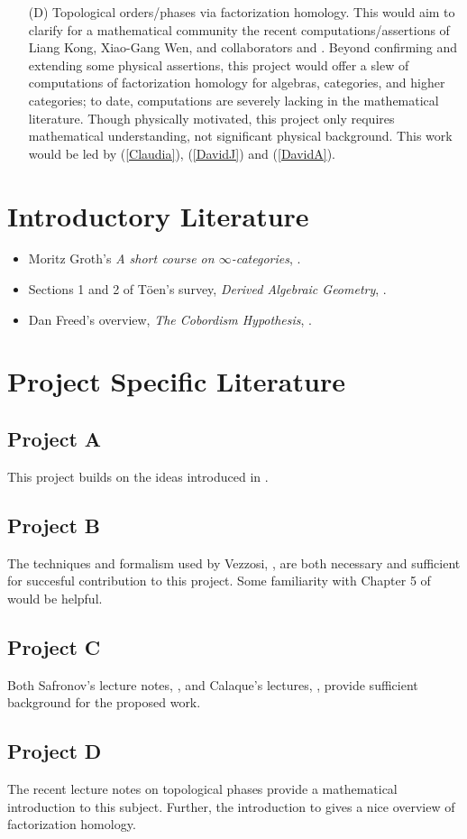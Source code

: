 \documentclass[11pt]{amsart}
\begin{document}
\begin{itemize}
\item[(D)] Topological orders/phases via factorization homology. 
This would aim to clarify for a mathematical community the recent computations/assertions of Liang Kong, Xiao-Gang Wen, and collaborators \cite{KW1} and \cite{KW2}. Beyond confirming and extending some physical assertions, this project would offer a slew of computations of factorization homology for algebras, categories, and higher categories; to date, computations are severely lacking in the mathematical literature. Though physically motivated, this project only requires mathematical understanding, not significant physical background. This work would be led by (\ref{Claudia}), (\ref{DavidJ}) and  (\ref{DavidA}).

\end{itemize}


\section*{Introductory Literature}
\begin{itemize}
\item Moritz Groth's {\it A short course on $\infty$-categories}, \cite{MG}.
\item Sections 1 and 2 of T\"oen's survey, {\it Derived Algebraic Geometry}, \cite{Toen}.
\item Dan Freed's overview, {\it The Cobordism Hypothesis}, \cite{DF}.
\end{itemize}



\section*{Project Specific Literature}

\subsection*{Project A} This project builds on the ideas introduced in \cite{TV1}.

\subsection*{Project B} The techniques and formalism used by Vezzosi, \cite{GV}, are both necessary and sufficient for succesful contribution to this project. Some familiarity with Chapter 5 of \cite{CG2} would be helpful.

\subsection*{Project C} Both Safronov's lecture notes, \cite{PS}, and Calaque's lectures, \cite{DC}, provide sufficient background for the proposed work.

\subsection*{Project D} The recent lecture notes on topological phases \cite{MS} provide a mathematical introduction to this subject. Further, the introduction to \cite{AF1} gives a nice overview of factorization homology.






\end{document}

